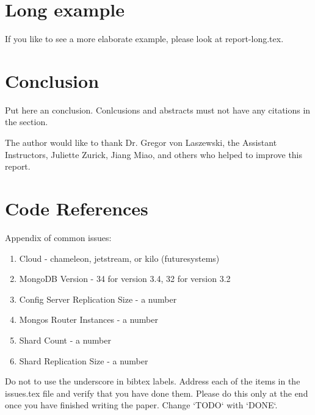 \documentclass[sigconf]{acmart}
\begin{document}
\section{Long example}

If you like to see a more elaborate example, please look at
report-long.tex. 

\section{Conclusion}

Put here an conclusion. Conlcusions and abstracts must not have any
citations in the section.


\begin{acks}

  The author would like to thank Dr. Gregor von Laszewski, 
    the Assistant Instructors, Juliette Zurick, Jiang Miao,
    and others who helped to improve this report. 

\end{acks}


 



\appendix

\section{Code References}

Appendix of common issues: 

\begin{enumerate}

\item Cloud - chameleon, jetstream, or kilo (futuresystems)
\item MongoDB Version - 34 for version 3.4, 32 for version 3.2
\item Config Server Replication Size - a number
\item Mongos Router Instances - a number
\item Shard Count - a number
\item Shard Replication Size - a number

\end{enumerate}


Do not to use the underscore in bibtex labels.  
Address each of the items in the issues.tex file 
and verify that you have done them. 
Please do this only at the end once you have 
finished writing the paper. 
Change `TODO` with `DONE`. 





%
\end{document}
